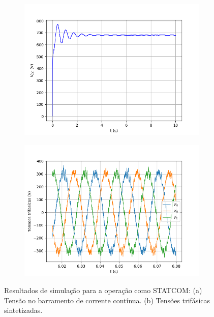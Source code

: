 \begin{figure}[!hbt]
	\centering
	\begin{subfigure}[b]{0.49\textwidth}
		\centering
		\includegraphics[width=\textwidth]{figuras/sim_figures/statcom/barramento-cc.png}
		\caption{ }
	\end{subfigure}
	\begin{subfigure}[b]{0.49\textwidth}
		\centering
		\includegraphics[width=\textwidth]{figuras/sim_figures/statcom/tensoes_trifasicas.png}
		\caption{ }
	\end{subfigure}

	\caption{Resultados de simulação para a operação como STATCOM: (a) Tensão no barramento de corrente contínua. (b) Tensões trifásicas sintetizadas.}
    \label{fig:sim-statcom}
\end{figure}

